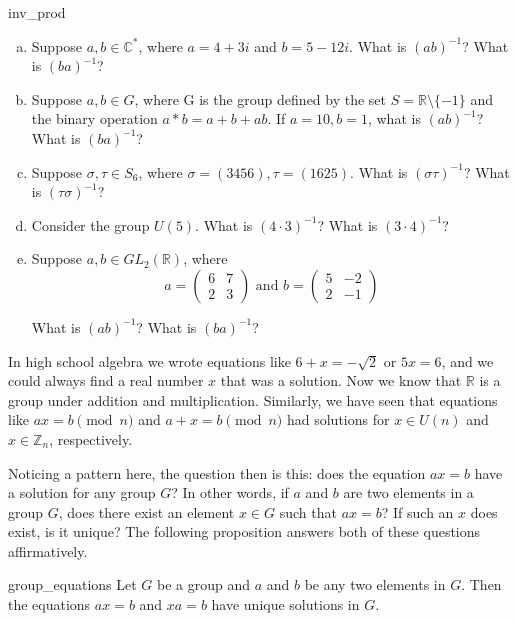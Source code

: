 \begin{exercise}{inv_prod}
\begin{enumerate}[(a)]
\item
Suppose $a,b \in {\mathbb C}^{\ast}$, where $a = 4 + 3i$ and $b = 5 - 12i$.  What is $(ab)^{-1}$?  What is $(ba)^{-1}$?
\item
Suppose $a,b \in G$, where G is the group defined by the set $S = {\mathbb R} \setminus \{ -1 \}$ and the binary operation $a \ast b = a + b +ab$.  If $a = 10, b = 1$, what is $(ab)^{-1}$?  What is $(ba)^{-1}$?
\item
Suppose $\sigma, \tau \in S_6$, where $\sigma = (3456), \tau = (1625)$.  What is $(\sigma \tau)^{-1}$?  What is $(\tau \sigma)^{-1}$?
\item
Consider the group $U(5)$.  What is $(4 \cdot 3)^{-1}$?  What is $(3 \cdot 4)^{-1}$?
\item
Suppose $a, b \in GL_2({\mathbb R})$, where
\[
a = \begin{pmatrix}
6 & 7 \\
2 & 3
\end{pmatrix} \mbox{ and }
b = \begin{pmatrix}
5 & -2 \\
2 & -1
\end{pmatrix} \]

What is $(ab)^{-1}$?  What is $(ba)^{-1}$?
\end{enumerate}
\end{exercise}{}

 
In high school algebra we wrote equations like $6 + x = -\sqrt{2}$ or $5x = 6$, and we could always find a real number $x$ that was a solution.  Now we know that ${\mathbb R}$ is a group under addition and multiplication.  Similarly, we have seen that  equations like $ax = b \pmod{n}$ and $a + x = b \pmod{n}$ had solutions for $x \in U(n)$ and $x \in {\mathbb Z}_n$, respectively. 

Noticing a pattern here, the question then is this:  does the equation $ax = b$ have a solution for any group $G$? 
In other words, if $a$ and $b$ are two elements in a group $G$, does there 
exist an element $x \in G$ such that $ax = b$? If such an $x$ does
exist, is it unique? The following proposition answers both of these
questions affirmatively. 
  
\begin{prop}{group_equations}
Let $G$ be a group and $a$ and $b$ be any two elements in $G$. Then
the equations $ax = b$ and $xa = b$ have unique solutions in $G$. 
\end{prop}

